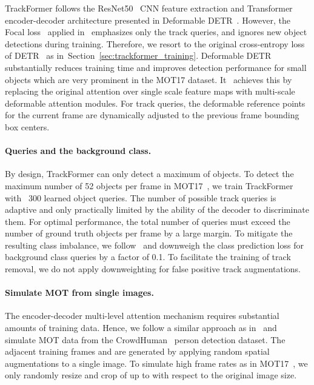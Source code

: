 \documentclass[10pt,twocolumn,letterpaper]{article}
\newcommand{\secref}[1]{Section~\ref{#1}}
\begin{document}
TrackFormer follows the ResNet50~\cite{he2016deep} CNN feature extraction and Transformer encoder-decoder architecture presented in Deformable DETR~\cite{deformable_detr}.
However, the Focal loss~\cite{lin2017focal} applied in~\cite{deformable_detr} emphasizes only the track queries, and ignores new object detections during training.
Therefore, we resort to the original cross-entropy loss of DETR~\cite{DETR} as in~\secref{sec:trackformer_training}.
Deformable DETR~\cite{deformable_detr}  substantially reduces training time and improves detection performance for small objects which are very prominent in the MOT17 dataset.
It~\cite{deformable_detr}  achieves this by replacing the original attention over single scale feature maps with multi-scale deformable attention modules.
For track queries, the deformable reference points for the current frame  are dynamically adjusted to the previous frame bounding box centers.

\paragraph{Queries and the background class.}
By design, \mbox{TrackFormer} can only detect a maximum of  objects.
To detect the maximum number of 52 objects per frame in MOT17~\cite{MOT16}, we train TrackFormer with ~300 learned object queries.
The number of possible track queries is adaptive and only practically limited by the ability of the decoder to discriminate them.
For optimal performance, the total number of queries must exceed the number of ground truth objects per frame by a large margin.
To mitigate the resulting class imbalance, we follow~\cite{DETR} and downweigh the class prediction loss for background class queries by a factor of 0.1.
To facilitate the training of track removal, we do not apply downweighting for false positive track augmentations.

\paragraph{Simulate MOT from single images.}
The encoder-decoder multi-level attention mechanism requires substantial amounts of training data.
Hence, we follow a similar approach as in~\cite{center_track} and simulate MOT data from the CrowdHuman~\cite{crowdhuman} person detection dataset.
The adjacent training frames  and  are generated by applying random spatial augmentations to a single image.
To simulate high frame rates as in MOT17~\cite{MOT16}, we only randomly resize and crop of up to  with respect to the original image size.
\end{document}
